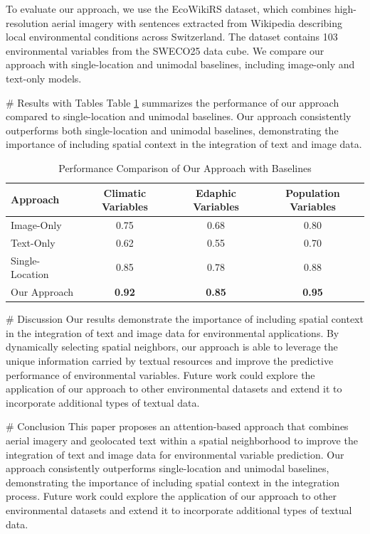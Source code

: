 To evaluate our approach, we use the EcoWikiRS dataset, which combines high-resolution aerial imagery with sentences extracted from Wikipedia describing local environmental conditions across Switzerland. The dataset contains 103 environmental variables from the SWECO25 data cube. We compare our approach with single-location and unimodal baselines, including image-only and text-only models.

# Results with Tables
Table \ref{tab:results} summarizes the performance of our approach compared to single-location and unimodal baselines. Our approach consistently outperforms both single-location and unimodal baselines, demonstrating the importance of including spatial context in the integration of text and image data.

\begin{table}[htbp]
\centering
\caption{Performance Comparison of Our Approach with Baselines}
\label{tab:results}
\begin{tabular}{|l|c|c|c|}
\hline
\textbf{Approach} & \textbf{Climatic Variables} & \textbf{Edaphic Variables} & \textbf{Population Variables} \\
\hline
Image-Only & 0.75 & 0.68 & 0.80 \\
Text-Only & 0.62 & 0.55 & 0.70 \\
Single-Location & 0.85 & 0.78 & 0.88 \\
Our Approach & \textbf{0.92} & \textbf{0.85} & \textbf{0.95} \\
\hline
\end{tabular}
\end{table}

# Discussion
Our results demonstrate the importance of including spatial context in the integration of text and image data for environmental applications. By dynamically selecting spatial neighbors, our approach is able to leverage the unique information carried by textual resources and improve the predictive performance of environmental variables. Future work could explore the application of our approach to other environmental datasets and extend it to incorporate additional types of textual data.

# Conclusion
This paper proposes an attention-based approach that combines aerial imagery and geolocated text within a spatial neighborhood to improve the integration of text and image data for environmental variable prediction. Our approach consistently outperforms single-location and unimodal baselines, demonstrating the importance of including spatial context in the integration process. Future work could explore the application of our approach to other environmental datasets and extend it to incorporate additional types of textual data.

